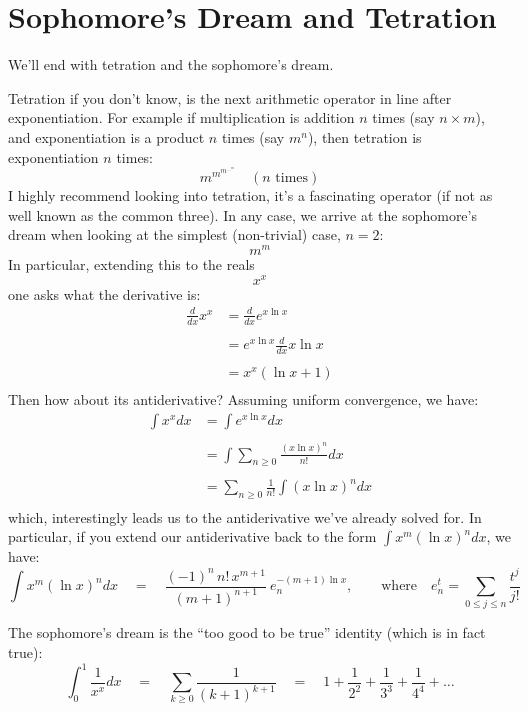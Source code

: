 \documentclass[twoside]{article}
\begin{document}
\section*{Sophomore's Dream and Tetration} %

We'll end with tetration and the sophomore's dream.

Tetration if you don't know, is the next arithmetic operator in line after exponentiation. For example if multiplication
is addition $ n $ times (say $ n\times m $), and exponentiation is a product $ n $ times (say $ m^n $), then tetration
is exponentiation $ n $ times:
$$ m^{m^{m^{{\ldots}^m}}}\quad (n\mbox{ times}) $$
I highly recommend looking into tetration, it's a fascinating operator (if not as well known as the common three).
In any case, we arrive at the sophomore's dream when looking at the simplest (non-trivial) case, $ n=2 $:
$$ m^m $$
In particular, extending this to the reals
$$ x^x $$
one asks what the derivative is:
\begin{align*}
\frac{d}{dx}x^x	& = \frac{d}{dx}e^{x\ln x}		\\
							\\
		& = e^{x\ln x}\frac{d}{dx}x\ln x	\\
							\\
		& = x^x(\ln x	+ 1)			\\
\end{align*}
Then how about its antiderivative? Assuming uniform convergence, we have:
\begin{align*}
\int x^x dx	& = \int e^{x\ln x} dx					\\
									\\
		& = \int\sum_{n\ge 0}\frac{(x\ln x)^n}{n!} dx		\\
									\\
		& = \sum_{n\ge 0}\frac{1}{n!}\int(x\ln x)^n dx		\\
\end{align*}
which, interestingly leads us to the antiderivative we've already solved for.
In particular, if you extend our antiderivative back to the form $ \int x^m(\ln x)^ndx $, we have:
$$ \int x^m(\ln x)^ndx\quad=\quad\frac{(-1)^n\,n!\,x^{m+1}}{(m+1)^{n+1}}\ e_n^{-(m+1)\ln x},
\qquad\mbox{where}\quad e_n^t=\sum_{0\le j\le n}\frac{t^j}{j!} $$

The sophomore's dream is the ``too good to be true'' identity (which is in fact true):
$$ \int_0^1\frac{1}{x^x}dx\quad=\quad\sum_{k\ge 0}\frac{1}{(k+1)^{k+1}}\quad=\quad 1+\frac{1}{2^2}+\frac{1}{3^3}+\frac{1}{4^4}+\ldots $$
\end{document}
